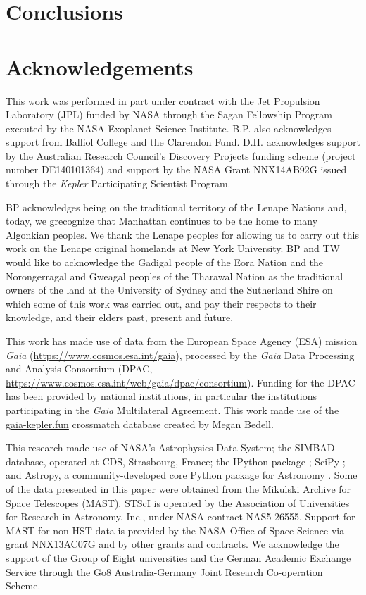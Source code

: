 \documentclass[a4paper,fleqn,usenatbib]{mnras}
\begin{document}
\section{Conclusions}
\label{conclusions}



\section*{Acknowledgements} %

This work was performed in part under contract with the Jet Propulsion Laboratory (JPL) funded by NASA through the Sagan Fellowship Program executed by the NASA Exoplanet Science Institute. B.P. also acknowledges support from Balliol College and the Clarendon Fund. D.H. acknowledges support by the Australian Research Council's Discovery Projects funding scheme (project number DE140101364) and support by the NASA Grant NNX14AB92G issued through the \emph{Kepler} Participating Scientist Program.

BP acknowledges being on the traditional territory of the Lenape Nations and, today, we grecognize that Manhattan continues to be the home to many Algonkian peoples. We thank the Lenape peoples for allowing us to carry out this work on the Lenape original homelands at New York University. BP and TW would like to acknowledge the Gadigal people of the Eora Nation and the Norongerragal and Gweagal peoples of the Tharawal Nation as the traditional owners of the land at the University of Sydney and the Sutherland Shire on which some of this work was carried out, and pay their respects to their knowledge, and their elders past, present and future.

This work has made use of data from the European Space Agency (ESA) mission
{\it Gaia} (\url{https://www.cosmos.esa.int/gaia}), processed by the {\it Gaia}
Data Processing and Analysis Consortium (DPAC,
\url{https://www.cosmos.esa.int/web/gaia/dpac/consortium}). Funding for the DPAC
has been provided by national institutions, in particular the institutions
participating in the {\it Gaia} Multilateral Agreement. This work made use of the \url{gaia-kepler.fun} crossmatch database created by Megan Bedell.

This research made use of NASA's Astrophysics Data System; the SIMBAD database, operated at CDS, Strasbourg, France; the IPython package \citep{PER-GRA:2007}; SciPy \citep{jones_scipy_2001}; and Astropy, a community-developed core Python package for Astronomy \citep{2013A&A...558A..33A}. Some of the data presented in this paper were obtained from the Mikulski Archive for Space Telescopes (MAST). STScI is operated by the Association of Universities for Research in Astronomy, Inc., under NASA contract NAS5-26555. Support for MAST for non-HST data is provided by the NASA Office of Space Science via grant NNX13AC07G and by other grants and contracts. We acknowledge the support of the Group of Eight universities and the German Academic Exchange Service through the Go8 Australia-Germany Joint Research Co-operation Scheme. 
\end{document}
